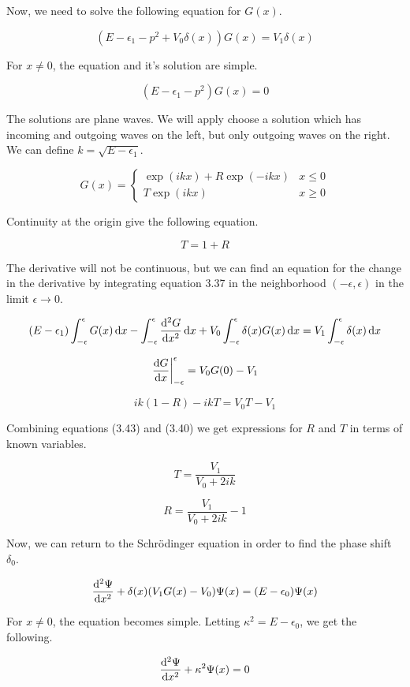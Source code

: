 \documentclass[12pt,letterpaper]{article}
\numberwithin{equation}{section}
\newcommand{\beq}{\begin{equation}}
\newcommand{\eeq}{\end{equation}}
\begin{document}
\noindent Now, we need to solve the following equation for $G(x)$.

\beq
(E - \epsilon_1 - p^2 + V_0\delta(x))G(x) = V_1 \delta(x)
\eeq

\noindent For $x\neq0$, the equation and it's solution are simple.

\beq
(E - \epsilon_1 - p^2)G(x) = 0
\eeq

\noindent The solutions are plane waves. We will apply choose a solution which has incoming and outgoing waves on the left, but only outgoing waves on the right. We can define $k = \sqrt{E - \epsilon_1}$.

\beq
G(x) = 
\begin{cases}
\exp(ikx) + R\exp(-ikx) & x\leq 0 \\
T\exp(ikx) & x\geq 0
\end{cases}
\eeq

\noindent Continuity at the origin give the following equation.

\beq
T = 1 + R
\eeq

\noindent The derivative will not be continuous, but we can find an equation for the change in the derivative by integrating equation 3.37 in the neighborhood $(-\epsilon,\epsilon)$ in the limit $\epsilon \rightarrow 0$.

\beq
(E - \epsilon_1) \int_{-\epsilon}^{\epsilon}G(x)\dd{x} - \int_{-\epsilon}^{\epsilon}\dv[2]{G}{x}\dd{x} + V_0\int_{-\epsilon}^{\epsilon}\delta(x)G(x)\dd{x} = V_1\int_{-\epsilon}^{\epsilon}\delta(x)\dd{x}
\eeq

\beq
\eval{\dv{G}{x}}_{-\epsilon}^\epsilon = V_0G(0) - V_1
\eeq 

\beq
ik(1-R) - ikT = V_0T - V_1
\eeq

\noindent Combining equations (3.43) and (3.40) we get expressions for $R$ and $T$ in terms of known variables.

\beq
T = \frac{V_1}{V_0 + 2ik}
\eeq

\beq
R = \frac{V_1}{V_0 + 2ik} - 1
\eeq 

\noindent Now, we can return to the Schrödinger equation in order to find the phase shift $\delta_0$.

\beq
\dv[2]{\Psi}{x} + \delta(x)(V_1G(x) - V_0)\Psi(x) = (E - \epsilon_0) \Psi(x) 
\eeq

\noindent For $x\neq0$, the equation becomes simple. Letting $\kappa^2 = E - \epsilon_0$, we get the following.

\beq
\dv[2]{\Psi}{x} + \kappa^2 \Psi(x) = 0
\eeq
\end{document}
